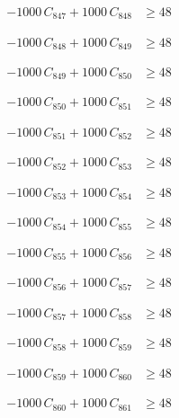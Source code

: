 \documentclass[a4paper,11pt]{article}
\begin{document}
\begin{align}
-1000\,C_{847} + 1000\,C_{848} &\geq 48 \nonumber
\end{align}

\begin{align}
-1000\,C_{848} + 1000\,C_{849} &\geq 48 \nonumber
\end{align}

\begin{align}
-1000\,C_{849} + 1000\,C_{850} &\geq 48 \nonumber
\end{align}

\begin{align}
-1000\,C_{850} + 1000\,C_{851} &\geq 48 \nonumber
\end{align}

\begin{align}
-1000\,C_{851} + 1000\,C_{852} &\geq 48 \nonumber
\end{align}

\begin{align}
-1000\,C_{852} + 1000\,C_{853} &\geq 48 \nonumber
\end{align}

\begin{align}
-1000\,C_{853} + 1000\,C_{854} &\geq 48 \nonumber
\end{align}

\begin{align}
-1000\,C_{854} + 1000\,C_{855} &\geq 48 \nonumber
\end{align}

\begin{align}
-1000\,C_{855} + 1000\,C_{856} &\geq 48 \nonumber
\end{align}

\begin{align}
-1000\,C_{856} + 1000\,C_{857} &\geq 48 \nonumber
\end{align}

\begin{align}
-1000\,C_{857} + 1000\,C_{858} &\geq 48 \nonumber
\end{align}

\begin{align}
-1000\,C_{858} + 1000\,C_{859} &\geq 48 \nonumber
\end{align}

\begin{align}
-1000\,C_{859} + 1000\,C_{860} &\geq 48 \nonumber
\end{align}

\begin{align}
-1000\,C_{860} + 1000\,C_{861} &\geq 48 \nonumber
\end{align}
\end{document}
